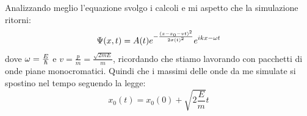 Analizzando meglio l'equazione svolgo i calcoli e mi aspetto che la simulazione ritorni:
\begin{equation}
\Psi(x,t) = A(t)e^{-\frac{\left( x-x_0- v t \right)^2}{2\sigma(t)^2}}e^{ikx-\omega t}
\end{equation}
dove $\omega = \frac E\hbar$  e $v = \frac{p}{m} =\frac{\sqrt{2m E}}{m} $, ricordando che stiamo lavorando con pacchetti di onde piane monocromatici.
Quindi che i massimi delle onde da me simulate si spostino nel tempo seguendo la legge:
\begin{equation}
x_0(t) = x_0(0)+\sqrt{2\frac{E}{m}} t
\end{equation}
